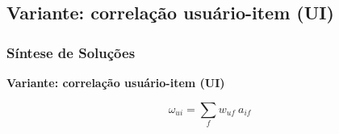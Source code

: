 \subsection{Variante: correlação usuário-item (UI)} %
\label{sub:variante_correla_o_usu_rio_item_}
\begin{frame}
\frametitle{Síntese de Soluções}
\textbf{Variante: correlação usuário-item (UI)}

\begin{equation}
\label{eq:wui} 
    \omega_{ui} = \sum_{f}{w_{uf}~a_{if}}
\end{equation} 
\end{frame}